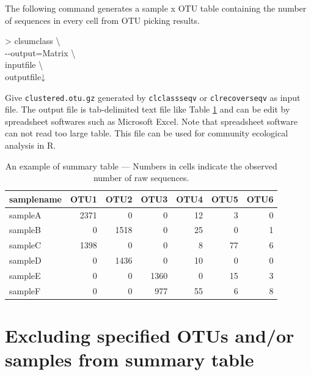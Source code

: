 \documentclass[titlepage,10pt,a4paper,english]{jsbook}
\newenvironment{cmd}{\begin{oframed}\raggedright\ttfamily\footnotesize\setlength{\baselineskip}{1.4em}}{\end{oframed}\vspace{-1em}}
\begin{document}
The following command generates a sample x OTU table containing the number of sequences in every cell from OTU picking results.
\begin{cmd}
{\textgreater} clsumclass {\textbackslash}\\
{-}{-}output=Matrix {\textbackslash}\\
inputfile {\textbackslash}\\
outputfile↓
\end{cmd}
Give \texttt{clustered.otu.gz} generated by \texttt{clclassseqv} or \texttt{clrecoverseqv} as input file.
The output file is tab-delimited text file like Table \ref{table:exampletableofsummary} and can be edit by spreadsheet softwares such as Microsoft Excel.
Note that spreadsheet software can not read too large table.
This file can be used for community ecological analysis in R.
\begin{table}[h]
\begin{center}
\footnotesize\setlength{\baselineskip}{0.9em}%
\begin{tabular}{l|rrrrrr} 
samplename & OTU1 & OTU2 & OTU3 & OTU4 & OTU5 & OTU6 \\\hline\hline
sampleA & 2371 & 0 & 0 & 12 & 3 & 0 \\
sampleB & 0 & 1518 & 0 & 25 & 0	& 1 \\
sampleC & 1398 & 0 & 0 & 8 & 77 & 6 \\
sampleD & 0 & 1436 & 0 & 10 & 0	& 0 \\
sampleE & 0 & 0 & 1360 & 0 & 15 & 3 \\
sampleF & 0 & 0 & 977 & 55 & 6 & 8 \\
\end{tabular}
\end{center}
\caption{An example of summary table --- Numbers in cells indicate the observed number of raw sequences.}
\label{table:exampletableofsummary}
\end{table}

\section{Excluding specified OTUs and/or samples from summary table}\label{section:clfiltersum}
\end{document}
